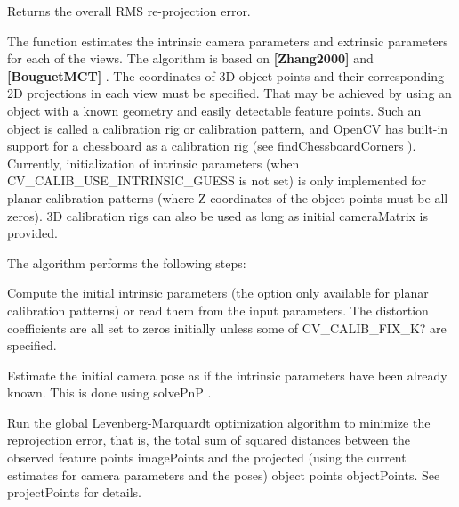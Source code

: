 \begin{DoxyReturn}{Returns}
the overall R\+MS re-\/projection error. 
\end{DoxyReturn}
The function estimates the intrinsic camera parameters and extrinsic parameters for each of the views. The algorithm is based on {\bfseries [Zhang2000]} and {\bfseries [Bouguet\+M\+CT]} . The coordinates of 3D object points and their corresponding 2D projections in each view must be specified. That may be achieved by using an object with a known geometry and easily detectable feature points. Such an object is called a calibration rig or calibration pattern, and Open\+CV has built-\/in support for a chessboard as a calibration rig (see find\+Chessboard\+Corners ). Currently, initialization of intrinsic parameters (when C\+V\+\_\+\+C\+A\+L\+I\+B\+\_\+\+U\+S\+E\+\_\+\+I\+N\+T\+R\+I\+N\+S\+I\+C\+\_\+\+G\+U\+E\+SS is not set) is only implemented for planar calibration patterns (where Z-\/coordinates of the object points must be all zeros). 3D calibration rigs can also be used as long as initial camera\+Matrix is provided. 

The algorithm performs the following steps\+: 


\begin{DoxyItemize}
\item Compute the initial intrinsic parameters (the option only available for planar calibration patterns) or read them from the input parameters. The distortion coefficients are all set to zeros initially unless some of C\+V\+\_\+\+C\+A\+L\+I\+B\+\_\+\+F\+I\+X\+\_\+K? are specified. 
\end{DoxyItemize}


\begin{DoxyItemize}
\item Estimate the initial camera pose as if the intrinsic parameters have been already known. This is done using solve\+PnP . 
\end{DoxyItemize}


\begin{DoxyItemize}
\item Run the global Levenberg-\/\+Marquardt optimization algorithm to minimize the reprojection error, that is, the total sum of squared distances between the observed feature points image\+Points and the projected (using the current estimates for camera parameters and the poses) object points object\+Points. See project\+Points for details. 
\end{DoxyItemize}

